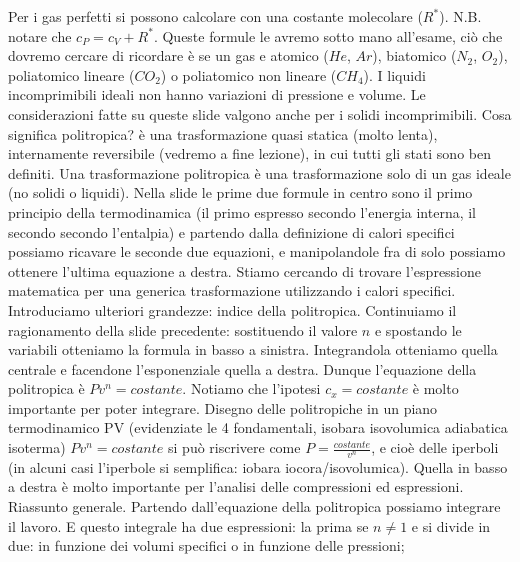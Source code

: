 \newline[26] Per i gas perfetti si possono calcolare con una costante molecolare ($R^*$). N.B. notare che $c_P = c_V + R^*$. Queste formule le avremo sotto mano all'esame, ciò che dovremo cercare di ricordare è se un gas e atomico ($He$, $Ar$), biatomico ($N_2$, $O_2$), poliatomico lineare ($CO_2$) o poliatomico non lineare ($CH_4$).
\newline[27] I liquidi incomprimibili ideali non hanno variazioni di pressione e volume. Le considerazioni fatte su queste slide valgono anche per i solidi incomprimibili.
\newline[28] Cosa significa politropica? è una trasformazione quasi statica (molto lenta), internamente reversibile (vedremo a fine lezione), in cui tutti gli stati sono ben definiti. Una trasformazione politropica è una trasformazione solo di un gas ideale (no solidi o liquidi). Nella slide le prime due formule in centro sono il primo principio della termodinamica (il primo espresso secondo l'energia interna, il secondo secondo l'entalpia) e partendo dalla definizione di calori specifici possiamo ricavare le seconde due equazioni, e manipolandole fra di solo possiamo ottenere l'ultima equazione a destra. Stiamo cercando di trovare l'espressione matematica per una generica trasformazione utilizzando i calori specifici.  
\newline[29] Introduciamo ulteriori grandezze: indice della politropica. Continuiamo il ragionamento della slide precedente: sostituendo il valore $n$ e spostando le variabili otteniamo la formula in basso a sinistra. Integrandola otteniamo quella centrale e facendone l'esponenziale quella a destra. Dunque l'equazione della politropica è $Pv^n = costante$. Notiamo che l'ipotesi $c_x = costante$ è molto importante per poter integrare.
\newline[30] Disegno delle politropiche in un piano termodinamico PV (evidenziate le 4 fondamentali, isobara isovolumica adiabatica isoterma)
\newline[31] $Pv^n = costante$ si può riscrivere come $P = \frac{costante}{v^n}$, e cioè delle iperboli (in alcuni casi l'iperbole si semplifica: iobara iocora/isovolumica).
\newline[32] Quella in basso a destra è molto importante per l'analisi delle compressioni ed espressioni.
\newline[33] Riassunto generale.
\newline[34] Partendo dall'equazione della politropica possiamo integrare il lavoro. E questo integrale ha due espressioni: la prima se $n \neq 1$ e si divide in due: in funzione dei volumi specifici o in funzione delle pressioni;
